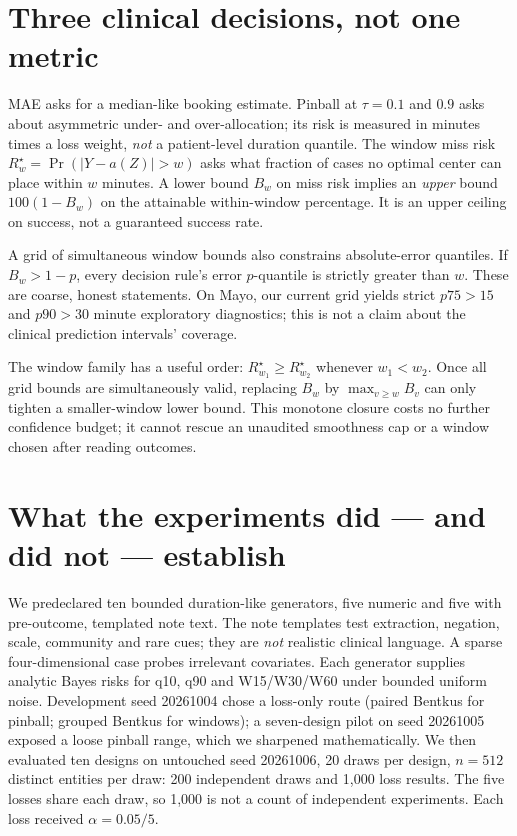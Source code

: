 \documentclass[11pt,a4paper]{article}
\newcommand{\risk}{R^{\star}}
\begin{document}
\section{Three clinical decisions, not one metric}

MAE asks for a median-like booking estimate. Pinball at $\tau=0.1$ and $0.9$ asks about asymmetric under- and over-allocation; its risk is measured in minutes times a loss weight, \emph{not} a patient-level duration quantile. The window miss risk $\risk_w=\Pr(|Y-a(Z)|>w)$ asks what fraction of cases no optimal center can place within $w$ minutes. A lower bound $B_w$ on miss risk implies an \emph{upper} bound $100(1-B_w)$ on the attainable within-window percentage. It is an upper ceiling on success, not a guaranteed success rate.

A grid of simultaneous window bounds also constrains absolute-error quantiles. If $B_w>1-p$, every decision rule's error $p$-quantile is strictly greater than $w$. These are coarse, honest statements. On Mayo, our current grid yields strict $p75>15$ and $p90>30$ minute exploratory diagnostics; this is not a claim about the clinical prediction intervals' coverage.

The window family has a useful order: $\risk_{w_1}\geq\risk_{w_2}$ whenever $w_1<w_2$. Once all grid bounds are simultaneously valid, replacing $B_w$ by $\max_{v\geq w}B_v$ can only tighten a smaller-window lower bound. This monotone closure costs no further confidence budget; it cannot rescue an unaudited smoothness cap or a window chosen after reading outcomes.

\section{What the experiments did --- and did not --- establish}

We predeclared ten bounded duration-like generators, five numeric and five with pre-outcome, templated note text. The note templates test extraction, negation, scale, community and rare cues; they are \emph{not} realistic clinical language. A sparse four-dimensional case probes irrelevant covariates. Each generator supplies analytic Bayes risks for q10, q90 and W15/W30/W60 under bounded uniform noise. Development seed 20261004 chose a loss-only route (paired Bentkus for pinball; grouped Bentkus for windows); a seven-design pilot on seed 20261005 exposed a loose pinball range, which we sharpened mathematically. We then evaluated ten designs on untouched seed 20261006, 20 draws per design, $n=512$ distinct entities per draw: 200 independent draws and 1,000 loss results. The five losses share each draw, so 1,000 is not a count of independent experiments. Each loss received $\alpha=0.05/5$.
\end{document}
